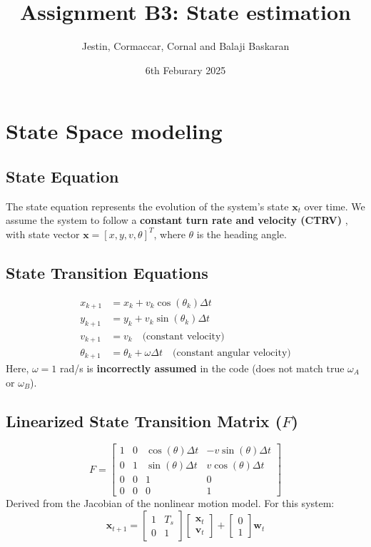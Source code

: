 \documentclass[a4paper,11pt]{article}
\title{Assignment B3: State estimation}
\author{Jestin, Cormaccar, Cornal and Balaji Baskaran}
\date{6th Feburary 2025}
\begin{document}
\maketitle

\section*{State Space modeling}

\subsection*{State Equation}
The state equation represents the evolution of the system's state \( \mathbf{x}_t \) over time. We assume the system to follow a \textbf{ constant turn rate and velocity (CTRV) },  with state vector $\mathbf{x} = [x, y, v, \theta]^T$, where $\theta$ is the heading angle.
\subsection*{State Transition Equations}
\begin{align*}
    x_{k+1} &= x_k + v_k \cos(\theta_k) \Delta t \\
    y_{k+1} &= y_k + v_k \sin(\theta_k) \Delta t \\
    v_{k+1} &= v_k \quad \text{(constant velocity)} \\
    \theta_{k+1} &= \theta_k + \omega \Delta t \quad \text{(constant angular velocity)}
\end{align*}
Here, $\omega = 1$ rad/s is \textbf{incorrectly assumed} in the code (does not match true $\omega_A$ or $\omega_B$).

\subsection*{Linearized State Transition Matrix ($F$)}
\begin{equation*}
    F =
    \begin{bmatrix}
        1 & 0 & \cos(\theta)\Delta t & -v \sin(\theta)\Delta t \\
        0 & 1 & \sin(\theta)\Delta t & v \cos(\theta)\Delta t \\
        0 & 0 & 1 & 0 \\
        0 & 0 & 0 & 1
    \end{bmatrix}
\end{equation*}
Derived from the Jacobian of the nonlinear motion model.
For this system:
\[
\mathbf{x}_{t+1} = 
\begin{bmatrix}
1 & T_s \\
0 & 1
\end{bmatrix} \begin{bmatrix}
   \mathbf{x}_t \\ \mathbf{v}_{t} 
\end{bmatrix}
 +
\begin{bmatrix}
0 \\
1
\end{bmatrix}
\mathbf{w}_{t}
\]
\end{document}
